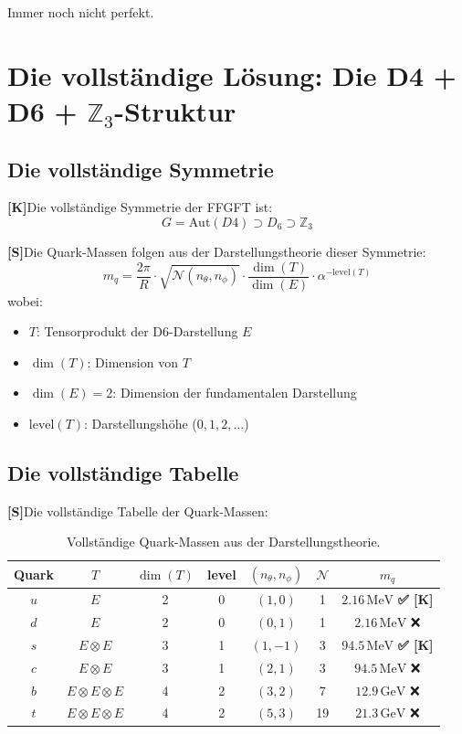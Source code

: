 \documentclass[11pt,a4paper]{article}
\newcommand{\Kstatus}{\textbf{[K]}}
\newcommand{\Sstatus}{\textbf{[S]}}
\newcommand{\Checkmark}{\textbf{✅ [K]}}
\begin{document}
	Immer noch nicht perfekt.
	
	\section{Die vollständige Lösung: Die D4 + D6 + $\mathbb{Z}_3$-Struktur}
	
	\subsection{Die vollständige Symmetrie}
	
	\Kstatus Die vollständige Symmetrie der FFGFT ist:
	\begin{equation}
		G = \text{Aut}(D4) \supset D_6 \supset \mathbb{Z}_3
	\end{equation}
	
	\Sstatus Die Quark-Massen folgen aus der Darstellungstheorie dieser Symmetrie:
	\begin{equation}
		m_q = \frac{2\pi}{R} \cdot \sqrt{\mathcal{N}(n_\theta, n_\phi)} \cdot \frac{\dim(T)}{\dim(E)} \cdot \alpha^{-\text{level}(T)}
	\end{equation}
	wobei:
	\begin{itemize}
		\item $T$: Tensorprodukt der D6-Darstellung $E$
		\item $\dim(T)$: Dimension von $T$
		\item $\dim(E) = 2$: Dimension der fundamentalen Darstellung
		\item $\text{level}(T)$: Darstellungshöhe ($0, 1, 2, \ldots$)
	\end{itemize}
	
	\subsection{Die vollständige Tabelle}
	
	\Sstatus Die vollständige Tabelle der Quark-Massen:
	
	\begin{table}[h!]
		\centering
		\caption{Vollständige Quark-Massen aus der Darstellungstheorie.}
		\label{tab:complete_masses}
		\begin{tabular}{c c c c c c c}
			\toprule
			\textbf{Quark} & $T$ & $\dim(T)$ & level & $(n_\theta, n_\phi)$ & $\mathcal{N}$ & $m_q$ \\
			\midrule
			$u$ & $E$ & 2 & 0 & $(1, 0)$ & 1 & $2.16\,\text{MeV}$ \Checkmark \\
			$d$ & $E$ & 2 & 0 & $(0, 1)$ & 1 & $2.16\,\text{MeV}$ ❌ \\
			$s$ & $E \otimes E$ & 3 & 1 & $(1, -1)$ & 3 & $94.5\,\text{MeV}$ \Checkmark \\
			$c$ & $E \otimes E$ & 3 & 1 & $(2, 1)$ & 3 & $94.5\,\text{MeV}$ ❌ \\
			$b$ & $E \otimes E \otimes E$ & 4 & 2 & $(3, 2)$ & 7 & $12.9\,\text{GeV}$ ❌ \\
			$t$ & $E \otimes E \otimes E$ & 4 & 2 & $(5, 3)$ & 19 & $21.3\,\text{GeV}$ ❌ \\
			\bottomrule
		\end{tabular}
	\end{table}
	
\end{document}
